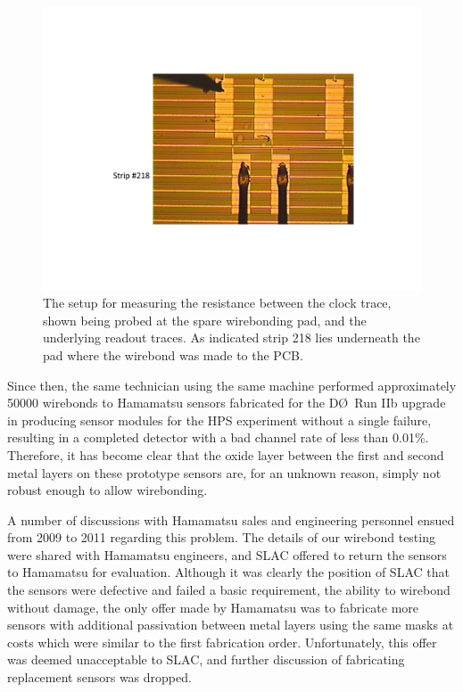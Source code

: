 \documentclass[prc,12pt,nofootinbib,letterpaper]{revtex4}
\begin{document}
\begin{figure}[htb]
\begin{center}
    \includegraphics[width=5in]{figures/strip-218}
\caption{The setup for measuring the resistance between the clock trace, shown being probed at the spare wirebonding pad, and the underlying readout traces.  As indicated strip 218 lies underneath the pad where the wirebond was made to the PCB.}
\label{fig:strip-218}
\end{center}
\end{figure}
Since then, the same technician using the same machine performed approximately 50000 wirebonds to Hamamatsu sensors fabricated for the D\O\ Run IIb upgrade in producing sensor modules for the HPS experiment without a single failure, resulting in a completed detector with a bad channel rate of less than 0.01\%.  Therefore, it has become clear that the oxide layer between the first and second metal layers on these prototype sensors are, for an unknown reason, simply not robust enough to allow wirebonding.

A number of discussions with Hamamatsu sales and engineering personnel ensued from 2009 to 2011 regarding this problem.  The details of our wirebond testing were shared with Hamamatsu engineers, and SLAC offered to return the sensors to Hamamatsu for evaluation. Although it was clearly the position of SLAC that the sensors were defective and failed a basic requirement, the ability to wirebond without damage, the only offer made by Hamamatsu was to fabricate more sensors with additional passivation between metal layers using the same masks at costs which were similar to the first fabrication order.  Unfortunately, this offer was deemed unacceptable to SLAC, and further discussion of fabricating replacement sensors was dropped.
\end{document}

